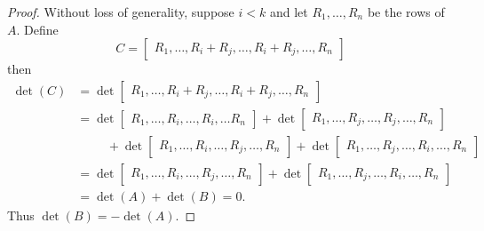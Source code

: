 \documentclass[linearalgebraI]{subfiles}
\begin{document}
    \begin{proof}
        Without loss of generality, suppose $i<k$ and let $R_1, \ldots, R_n$ be the rows of $A$. Define
        \begin{equation*}
            C = \begin{bmatrix}
                R_1, \ldots, R_i+R_j, \ldots, R_i+R_j, \ldots, R_n
            \end{bmatrix}
        \end{equation*}
        then
        \begin{align*}
            \det(C) & = \det 
            \begin{bmatrix}
                R_1, \ldots, R_i+R_j, \ldots, R_i+R_j, \ldots, R_n
            \end{bmatrix} \\
                    & = \det 
            \begin{bmatrix}
                R_1, \ldots, R_i, \ldots, R_i, \ldots R_n
            \end{bmatrix}
            + \det 
            \begin{bmatrix}
                R_1, \ldots, R_j, \ldots, R_j, \ldots, R_n
            \end{bmatrix} \\
                    & \hspace{1cm} + \det 
            \begin{bmatrix}
                R_1, \ldots, R_i, \ldots, R_j, \ldots, R_n
            \end{bmatrix}
            + \det 
            \begin{bmatrix}
                R_1, \ldots, R_j, \ldots, R_i, \ldots, R_n
            \end{bmatrix} \\
                   & = \det 
                   \begin{bmatrix}
                       R_1, \ldots, R_i, \ldots, R_j, \ldots, R_n
                   \end{bmatrix}
                   + \det 
                   \begin{bmatrix}
                       R_1, \ldots, R_j, \ldots, R_i, \ldots, R_n
                   \end{bmatrix} \\
                   & = \det(A) + \det(B) = 0.
        \end{align*} 
        Thus $\det(B)=-\det(A)$.
    \end{proof}
\end{document}
